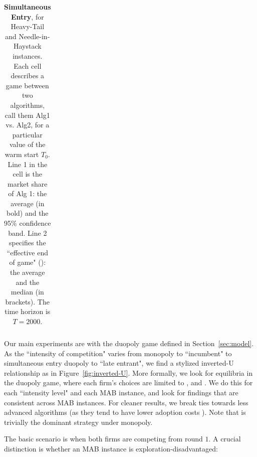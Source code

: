 \documentclass[../competing_bandits_with_appendix.tex]{subfiles}
\begin{document}
\begin{table}[t]
\begin{tabular}{|c|c|c|c||c|c|c|}
  \\
   \hline
\end{tabular}
\normalsize
\caption{{\bf Simultaneous Entry}, for Heavy-Tail and Needle-in-Haystack instances. Each cell describes a game between two algorithms, call them Alg1 vs. Alg2, for a particular value of the warm start $T_0$. Line 1 in the cell is the market share of Alg 1: the average (in bold) and the 95\% confidence band.
Line 2 specifies the ``effective end of game" (\Eeog): the average and the median (in brackets). The time horizon is $T=2000$.}
\label{sim_table}
\end{table}

\normalsize
Our main experiments are with the duopoly game defined in Section~\ref{sec:model}. As the ``intensity of competition" varies from  monopoly to ``incumbent" to simultaneous entry duopoly to ``late entrant", we find a stylized inverted-U relationship as in Figure~\ref{fig:inverted-U}. More formally, we look for equilibria in the duopoly game, where each firm's choices are limited to \DG, \DEG and \TS. We do this for each ``intensity level" and each MAB instance, and look for findings that are consistent across MAB instances. For cleaner results, we break ties towards less advanced algorithms (as they tend to have lower adoption costs \cite{MWT-WhitePaper-2016,DS-arxiv}). Note that \DG is trivially the dominant strategy under monopoly.



The basic scenario is when both firms are competing from round $1$. A crucial distinction is whether an MAB instance is exploration-disadvantaged:

\end{document}
